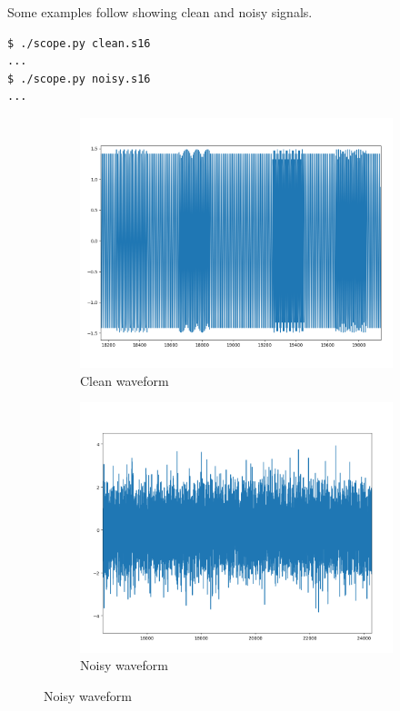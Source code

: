 \documentclass[a4paper]{article}
\begin{document}
Some examples follow showing clean and noisy signals.

\begin{lstlisting}
$ ./scope.py clean.s16
...
$ ./scope.py noisy.s16
...
\end{lstlisting}

\begin{figure}[H]
    \centering
    \begin{subfigure}[b]{0.45\textwidth}
        \includegraphics[width=\textwidth]{scope_clean.png}
        \caption{\label{fig:scope_clean}Clean waveform}
    \end{subfigure}
    \begin{subfigure}[b]{0.45\textwidth}
        \includegraphics[width=\textwidth]{scope_noisy.png}
        \caption{\label{fig:scope_noisy}Noisy waveform}
    \end{subfigure}
\end{figure}
\end{document}
